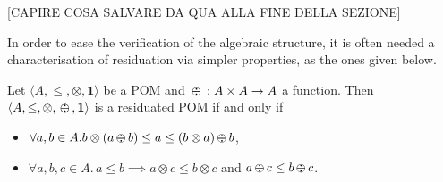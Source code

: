 \documentclass{llncs}
\newcommand{\shortNoProof}[1]{ }
\def\monid{{\mathbf 0}}
\def\monop{\otimes}
\def\odiv{\, {\ominus\hspace{-7.7pt} \div} \,}
\def\monid{\mathbf{1}}
\begin{document}
[CAPIRE COSA SALVARE DA QUA ALLA FINE DELLA SEZIONE]

In order to ease the verification of the algebraic structure, it is often needed
a characterisation of residuation via simpler properties,
as the ones given below.

\begin{lemma}
\label{mono}
Let $\langle A, \leq, \monop, \monid \rangle$ be a POM  and
	$\odiv: A \times A \rightarrow A$ a function. Then $\langle A, \leq, \monop, \odiv, \monid \rangle$ is a residuated POM if and only if
	\begin{itemize}
		\item $\forall a, b \in A. b \monop (a \odiv b) \leq a \leq (b \monop a) \odiv b$,
		\item $\forall a, b, c \in A.\, a \leq b \implies a \otimes c \leq b \otimes c$ and $a\odiv c \leq b \odiv c$.
\end{itemize}
\end{lemma}

\shortNoProof{
\begin{proof} ($\Longrightarrow$)
The first item is immediate. Now, let $a \leq b$. Since $b \leq (b \otimes c) \odiv c$ and 
$c \otimes (a \odiv c) \leq a$, the second item follows.

($\Longleftarrow$)
Using the monotonicity of $\odiv$ from $b \monop c \leq a$ we get
 $(b \monop c) \odiv b \leq a \odiv b$, and by the first item
 $c \leq a \odiv b$.
 From the latter by the monotonicity of $\otimes$ we get
 $b \otimes c \leq b \otimes (a \odiv b)$, and by the first item
 $b \monop c \leq a$.
\qed
\end{proof}
}


\end{document}
